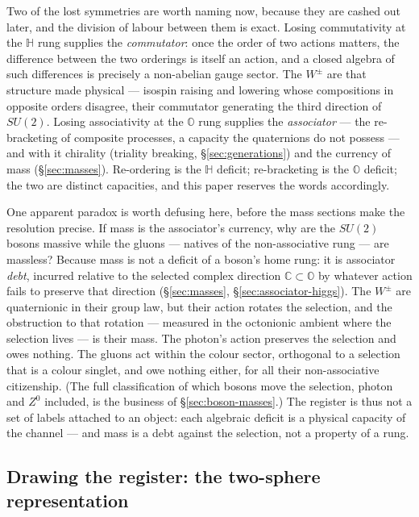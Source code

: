 Two of the lost symmetries are worth naming now, because they are cashed out later, and the
division of labour between them is exact. Losing commutativity at the $\mathbb{H}$ rung supplies
the \emph{commutator}: once the order of two actions matters, the difference between the two
orderings is itself an action, and a closed algebra of such differences is precisely a non-abelian
gauge sector. The $W^{\pm}$ are that structure made physical --- isospin raising and lowering whose
compositions in opposite orders disagree, their commutator generating the third direction of
$SU(2)$. Losing associativity at the $\mathbb{O}$ rung supplies the \emph{associator} --- the
re-bracketing of composite processes, a capacity the quaternions do not possess --- and with it
chirality (triality breaking, \S\ref{sec:generations}) and the currency of mass
(\S\ref{sec:masses}). Re-ordering is the $\mathbb{H}$ deficit; re-bracketing is the $\mathbb{O}$
deficit; the two are distinct capacities, and this paper reserves the words accordingly.

One apparent paradox is worth defusing here, before the mass sections make the resolution precise.
If mass is the associator's currency, why are the $SU(2)$ bosons massive while the gluons ---
natives of the non-associative rung --- are massless? Because mass is not a deficit of a boson's
home rung: it is associator \emph{debt}, incurred relative to the selected complex direction
$\mathbb{C} \subset \mathbb{O}$ by whatever action fails to preserve that direction
(\S\ref{sec:masses}, \S\ref{sec:associator-higgs}). The $W^{\pm}$ are quaternionic in their
group law, but their action rotates the selection, and the obstruction to that rotation ---
measured in the octonionic ambient where the selection lives --- is their mass. The photon's action
preserves the selection and owes nothing. The gluons act within the colour sector, orthogonal to a
selection that is a colour singlet, and owe nothing either, for all their non-associative
citizenship. (The full classification of which bosons move the selection, photon and $Z^{0}$
included, is the business of \S\ref{sec:boson-masses}.) The register is thus not a set of labels
attached to an object: each algebraic deficit is a physical capacity of the channel --- and mass is
a debt against the selection, not a property of a rung.

\subsection{Drawing the register: the two-sphere representation}

